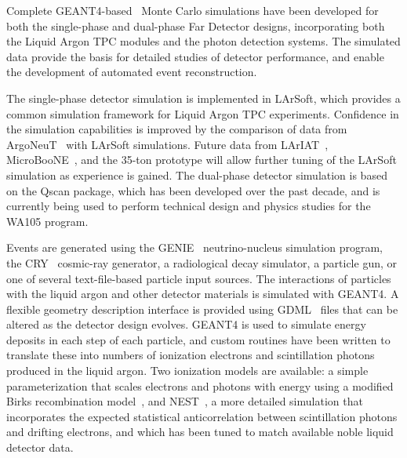 
%
%
%

Complete GEANT4-based~\cite{geant4} Monte Carlo simulations have been 
developed for both the single-phase and dual-phase Far Detector designs,
incorporating both the Liquid Argon TPC modules
and the photon detection systems. The simulated data provide
the basis for detailed studies of detector performance, 
and enable the development of automated event reconstruction.

The single-phase detector simulation is implemented in LArSoft,
which provides a common simulation framework for Liquid Argon TPC experiments.
Confidence in the simulation capabilities is improved by
the comparison of data from ArgoNeuT~\cite{argoneut} with LArSoft
simulations.  Future data from LArIAT~\cite{lariat},
MicroBooNE~\cite{microboone}, and the 35-ton prototype will allow
further tuning of the LArSoft simulation as experience is gained.
The dual-phase detector simulation is based on the Qscan package,
which has been developed over the past decade, and is currently
being used to perform technical design and physics studies for
the WA105 program.


Events are generated using the GENIE~\cite{genie} neutrino-nucleus
simulation program, the CRY~\cite{cry} cosmic-ray generator, a
radiological decay simulator, a particle gun, or one of several
text-file-based particle input sources.  The interactions of particles
with the liquid argon and other detector materials is simulated with
GEANT4.  A flexible geometry description interface is provided using
GDML~\cite{gdml} files that can be altered as the detector design
evolves.  GEANT4 is used to simulate energy deposits in each step of
each particle, and custom routines have been written to translate
these into numbers of ionization electrons and scintillation photons
produced in the liquid argon.  Two ionization models are available: a
simple parameterization that scales electrons and photons with energy
using a modified Birks recombination model~\cite{birks}, and
NEST~\cite{nest}, a more detailed simulation that incorporates the
expected statistical anticorrelation between scintillation photons and
drifting electrons, and which has been tuned to match available noble
liquid detector data.


